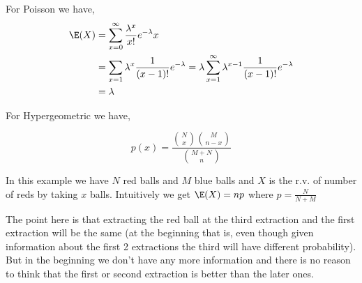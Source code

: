 \begin{eg}
    For Poisson we have, 
    \begin{align*}
        \E(X) &= \sum_{x = 0}^{\infty} \frac{\lambda^{x}}{x!} e^{-\lambda} x \\
              &= \sum_{x = 1} \lambda^{x} \frac{1}{(x - 1)!} e^{-\lambda} = \lambda \sum_{x = 1}^{\infty} \lambda^{x - 1} \frac{1}{(x - 1)!} e^{-\lambda}\\
              &= \lambda
    \end{align*}
\end{eg}

\begin{eg}
    For Hypergeometric we have, 


    $$ p(x) = \frac{{N \choose x} {M \choose n - x}}{{M + N \choose n}}$$

    In this example we have $N$ red balls and $M$ blue balls and $X$ is the r.v. of number of reds by taking $x$ balls. Intuitively we get $\E(X) = n p$ where  $p = \frac{N}{N + M}$
\end{eg}
\begin{remark}
     The point here is that extracting the red ball at the third extraction and the first extraction will be the same (at the beginning that is, even though given information about the first 2 extractions the third will have different probability). But in the beginning we don't have any more information and there is no reason to think that the first or second extraction is better than the later ones.
\end{remark}
